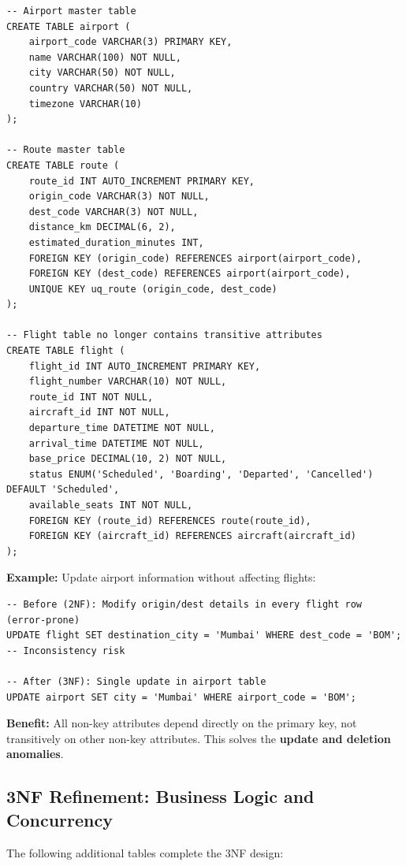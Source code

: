 \documentclass[12pt, a4paper]{article}
\begin{document}
\begin{lstlisting}[style=sqlstyle]
-- Airport master table
CREATE TABLE airport (
    airport_code VARCHAR(3) PRIMARY KEY,
    name VARCHAR(100) NOT NULL,
    city VARCHAR(50) NOT NULL,
    country VARCHAR(50) NOT NULL,
    timezone VARCHAR(10)
);

-- Route master table
CREATE TABLE route (
    route_id INT AUTO_INCREMENT PRIMARY KEY,
    origin_code VARCHAR(3) NOT NULL,
    dest_code VARCHAR(3) NOT NULL,
    distance_km DECIMAL(6, 2),
    estimated_duration_minutes INT,
    FOREIGN KEY (origin_code) REFERENCES airport(airport_code),
    FOREIGN KEY (dest_code) REFERENCES airport(airport_code),
    UNIQUE KEY uq_route (origin_code, dest_code)
);

-- Flight table no longer contains transitive attributes
CREATE TABLE flight (
    flight_id INT AUTO_INCREMENT PRIMARY KEY,
    flight_number VARCHAR(10) NOT NULL,
    route_id INT NOT NULL,
    aircraft_id INT NOT NULL,
    departure_time DATETIME NOT NULL,
    arrival_time DATETIME NOT NULL,
    base_price DECIMAL(10, 2) NOT NULL,
    status ENUM('Scheduled', 'Boarding', 'Departed', 'Cancelled') DEFAULT 'Scheduled',
    available_seats INT NOT NULL,
    FOREIGN KEY (route_id) REFERENCES route(route_id),
    FOREIGN KEY (aircraft_id) REFERENCES aircraft(aircraft_id)
);
\end{lstlisting}

\textbf{Example:} Update airport information without affecting flights:
\begin{lstlisting}[style=sqlstyle]
-- Before (2NF): Modify origin/dest details in every flight row (error-prone)
UPDATE flight SET destination_city = 'Mumbai' WHERE dest_code = 'BOM';  -- Inconsistency risk

-- After (3NF): Single update in airport table
UPDATE airport SET city = 'Mumbai' WHERE airport_code = 'BOM';
\end{lstlisting}

\textbf{Benefit:} All non-key attributes depend directly on the primary key, not transitively on other non-key attributes. This solves the \textbf{update and deletion anomalies}.

\subsection{3NF Refinement: Business Logic and Concurrency}

The following additional tables complete the 3NF design:
\end{document}
